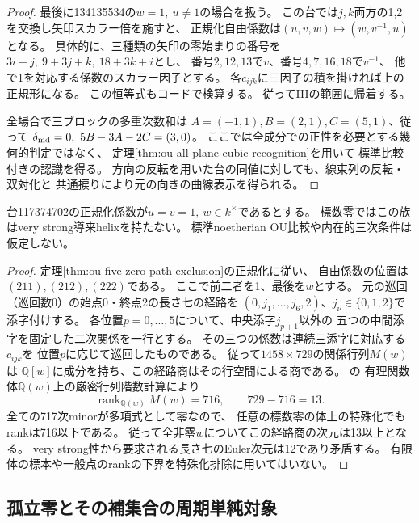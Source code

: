 \begin{proof}
最後に134135534の$w=1,\ u\ne1$の場合を扱う。
この台では$j,k$両方の1,2を交換し矢印スカラー倍を施すと、
正規化自由係数は$(u,v,w)\mapsto(w,v^{-1},u)$となる。
具体的に、三種類の矢印の零始まりの番号を
$3i+j,\ 9+3j+k,\ 18+3k+i$とし、
番号$2,12,13$で$v$、番号$4,7,16,18$で$v^{-1}$、
他で1を対応する係数のスカラー因子とする。
各$c_{ijk}$に三因子の積を掛ければ上の正規形になる。
この恒等式もコードで検算する。
従ってIIIの範囲に帰着する。

全場合で三ブロックの多重次数和は
$A=(-1,1),B=(2,1),C=(5,1)$、従って
$\delta_{\rm md}=0,\ 5B-3A-2C=(3,0)$。
ここでは全成分での正性を必要とする幾何的判定ではなく、
定理\ref{thm:ou-all-plane-cubic-recognition}を用いて
標準比較付きの認識を得る。
方向の反転を用いた台の同値に対しても、線束列の反転・双対化と
共通捩りにより元の向きの曲線表示を得られる。
\end{proof}

\begin{theorem}
\label{thm:ou-five-zero-117374702-boundary}
台117374702の正規化係数が$u=v=1,\ w\in k^\times$であるとする。
標数零ではこの族はvery strong導来helixを持たない。
標準noetherian OU比較や内在的三次条件は仮定しない。
\end{theorem}
\begin{proof}
定理\ref{thm:ou-five-zero-path-exclusion}の正規化に従い、
自由係数の位置は$(211),(212),(222)$である。
ここで前二者を1、最後を$w$とする。
元の巡回（巡回数0）の始点0・終点2の長さ七の経路を
$(0,j_1,\ldots,j_6,2)$、$j_\nu\in\{0,1,2\}$で添字付けする。
各位置$p=0,\ldots,5$について、中央添字$j_{p+1}$以外の
五つの中間添字を固定した二次関係を一行とする。
その三つの係数は連続三添字に対応する$c_{ijk}$を
位置$p$に応じて巡回したものである。
従って$1458\times729$の関係行列$M(w)$は
$\mathbb Q[w]$に成分を持ち、この経路商はその行空間による商である。
の
有理関数体$\mathbb Q(w)$上の厳密行列階数計算により
\[
 \operatorname{rank}_{\mathbb Q(w)}M(w)=716,\qquad
 729-716=13.
\]
全ての717次minorが多項式として零なので、
任意の標数零の体上の特殊化でもrankは716以下である。
従って全非零$w$についてこの経路商の次元は13以上となる。
very strong性から要求される長さ七のEuler次元は12であり矛盾する。
有限体の標本や一般点のrankの下界を特殊化排除に用いてはいない。
\end{proof}

\subsection{孤立零とその補集合の周期単純対象}

